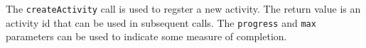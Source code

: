 The \verb+createActivity+ call is used to regster a new activity. The
return value is an activity id that can be used in subsequent calls. The
\verb+progress+ and \verb+max+ parameters can be used to indicate some measure of
completion.
